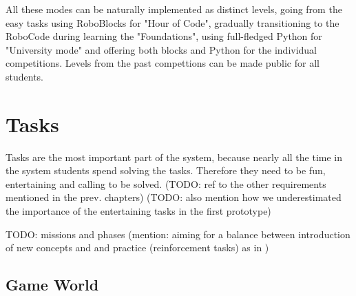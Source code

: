All these modes can be naturally implemented as distinct levels,
going from the easy tasks using RoboBlocks for "Hour of Code",
gradually transitioning to the RoboCode during learning the "Foundations",
using full-fledged Python for "University mode"
and offering both blocks and Python for the individual competitions.
Levels from the past compettions can be made public for all students.


\section{Tasks}
\label{sec:robomission.tasks}

Tasks are the most important part of the system,
because nearly all the time in the system students spend solving the tasks.
Therefore they need to be fun, entertaining and calling to be solved.
(TODO: ref to the other requirements mentioned in the prev. chapters)
(TODO: also mention how we underestimated the importance of the entertaining tasks in the first prototype)

TODO: missions and phases (mention: aiming for a balance between introduction of new concepts and and practice (reinforcement tasks) as in \cite{progression-analysis})

\subsection{Game World}
\label{sec:robomission.game-world}


